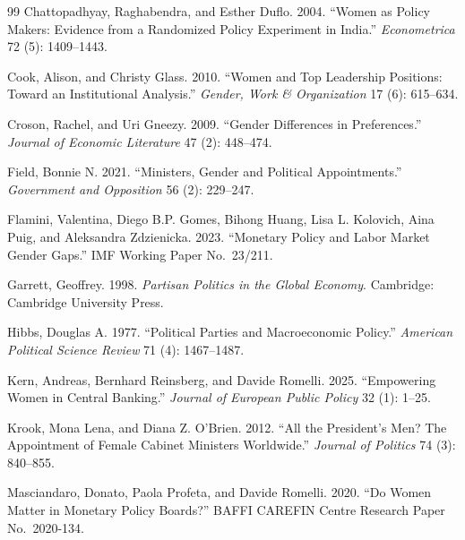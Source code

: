 \documentclass[12pt]{article}
\begin{document}
\begin{thebibliography}{99}
Chattopadhyay, Raghabendra, and Esther Duflo. 2004. ``Women as Policy
Makers: Evidence from a Randomized Policy Experiment in India.''
\textit{Econometrica} 72 (5): 1409--1443.

Cook, Alison, and Christy Glass. 2010. ``Women and Top Leadership
Positions: Toward an Institutional Analysis.'' 
\textit{Gender, Work \& Organization} 17 (6): 615--634.

Croson, Rachel, and Uri Gneezy. 2009. ``Gender Differences in
Preferences.'' 
\textit{Journal of Economic Literature} 47 (2):
448--474.

Field, Bonnie N. 2021. ``Ministers, Gender and Political
Appointments.'' 
\textit{Government and Opposition} 56 (2): 229--247.

Flamini, Valentina, Diego B.P. Gomes, Bihong Huang, Lisa L. Kolovich,
Aina Puig, and Aleksandra Zdzienicka. 2023. ``Monetary Policy and
Labor Market Gender Gaps.'' IMF Working Paper No.~23/211.

Garrett, Geoffrey. 1998. \textit{Partisan Politics in the Global
Economy}. Cambridge: Cambridge University Press.

Hibbs, Douglas A. 1977. ``Political Parties and Macroeconomic
Policy.'' 
\textit{American Political Science Review} 71 (4):
1467--1487.


Kern, Andreas, Bernhard Reinsberg, and Davide Romelli. 2025.
``Empowering Women in Central Banking.'' 
\textit{Journal of European
Public Policy} 32 (1): 1--25.

Krook, Mona Lena, and Diana Z. O'Brien. 2012. ``All the President's
Men? The Appointment of Female Cabinet Ministers Worldwide.''
\textit{Journal of Politics} 74 (3): 840--855.

Masciandaro, Donato, Paola Profeta, and Davide Romelli. 2020. ``Do
Women Matter in Monetary Policy Boards?'' BAFFI CAREFIN Centre
Research Paper No.~2020-134.


\end{thebibliography}
\end{document}
